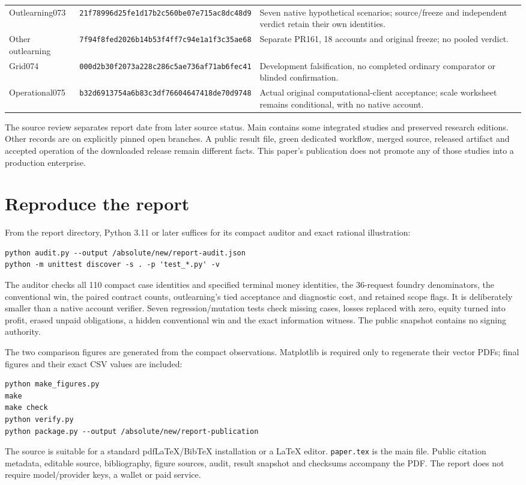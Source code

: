 \begin{longtable}{@{}P{2.8cm}P{4.1cm}P{7.4cm}@{}}
Outlearning073 & \nolinkurl{21f78996d25fe1d17b2c560be07e715ac8dc48d9} & Seven native hypothetical scenarios; source/freeze and independent verdict retain their own identities.\\
Other outlearning & \nolinkurl{7f94f8fed2026b14b53f4ff7c94e1a1f3c35ae68} & Separate PR161, 18 accounts and original freeze; no pooled verdict.\\
Grid074 & \nolinkurl{000d2b30f2073a228c286c5ae736af71ab6fec41} & Development falsification, no completed ordinary comparator or blinded confirmation.\\
Operational075 & \nolinkurl{b32d6913754a6b83c3df76604647418de70d9748} & Actual original computational-client acceptance; scale worksheet remains conditional, with no native account.\\\bottomrule
\end{longtable}

The source review separates report date from later source status. Main contains some integrated studies and preserved research editions. Other records are on explicitly pinned open branches. A public result file, green dedicated workflow, merged source, released artifact and accepted operation of the downloaded release remain different facts. This paper's publication does not promote any of those studies into a production enterprise.

\section{Reproduce the report}
From the report directory, Python 3.11 or later suffices for its compact auditor and exact rational illustration:
\begin{lstlisting}
python audit.py --output /absolute/new/report-audit.json
python -m unittest discover -s . -p 'test_*.py' -v
\end{lstlisting}
The auditor checks all 110 compact case identities and specified terminal money identities, the 36-request foundry denominators, the conventional win, the paired contract counts, outlearning's tied acceptance and diagnostic cost, and retained scope flags. It is deliberately smaller than a native account verifier. Seven regression/mutation tests check missing cases, losses replaced with zero, equity turned into profit, erased unpaid obligations, a hidden conventional win and the exact information witness. The public snapshot contains no signing authority.

The two comparison figures are generated from the compact observations. Matplotlib is required only to regenerate their vector PDFs; final figures and their exact CSV values are included:
\begin{lstlisting}
python make_figures.py
make
make check
python verify.py
python package.py --output /absolute/new/report-publication
\end{lstlisting}
The source is suitable for a standard pdfLaTeX/BibTeX installation or a LaTeX editor. \texttt{paper.tex} is the main file. Public citation metadata, editable source, bibliography, figure sources, audit, result snapshot and checksums accompany the PDF. The report does not require model/provider keys, a wallet or paid service.


